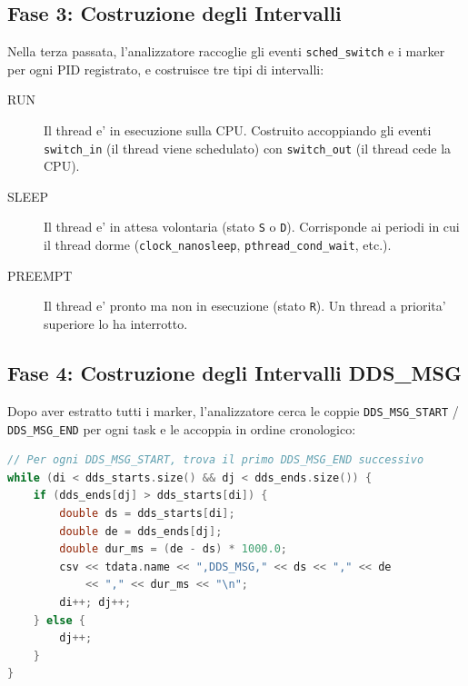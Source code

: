 \subsection{Fase 3: Costruzione degli Intervalli}
\label{subsec:intervals}

Nella terza passata, l'analizzatore raccoglie gli eventi \texttt{sched\_switch}
e i marker per ogni PID registrato, e costruisce tre tipi di intervalli:

\begin{description}
    \item[RUN] Il thread e' in esecuzione sulla CPU.
        Costruito accoppiando gli eventi \texttt{switch\_in}
        (il thread viene schedulato) con \texttt{switch\_out}
        (il thread cede la CPU).
    \item[SLEEP] Il thread e' in attesa volontaria (stato \texttt{S} o \texttt{D}).
        Corrisponde ai periodi in cui il thread dorme
        (\texttt{clock\_nanosleep}, \texttt{pthread\_cond\_wait}, etc.).
    \item[PREEMPT] Il thread e' pronto ma non in esecuzione (stato \texttt{R}).
        Un thread a priorita' superiore lo ha interrotto.
\end{description}

\subsection{Fase 4: Costruzione degli Intervalli DDS\_MSG}
\label{subsec:dds_msg_intervals}

Dopo aver estratto tutti i marker, l'analizzatore cerca le coppie
\texttt{DDS\_MSG\_START} / \texttt{DDS\_MSG\_END} per ogni task e le
accoppia in ordine cronologico:

\begin{lstlisting}[language=C++, caption={Accoppiamento dei marker DDS\_MSG.}, label={lst:dds_pairing}]
// Per ogni DDS_MSG_START, trova il primo DDS_MSG_END successivo
while (di < dds_starts.size() && dj < dds_ends.size()) {
    if (dds_ends[dj] > dds_starts[di]) {
        double ds = dds_starts[di];
        double de = dds_ends[dj];
        double dur_ms = (de - ds) * 1000.0;
        csv << tdata.name << ",DDS_MSG," << ds << "," << de
            << "," << dur_ms << "\n";
        di++; dj++;
    } else {
        dj++;
    }
}
\end{lstlisting}

